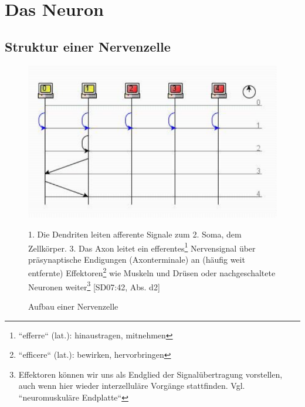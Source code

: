 \chapter{Das Neuron}

\section{Struktur einer Nervenzelle}

\begin{figure}[h]
	\centering
		\includegraphics{images/p1ReadSeq.pdf}
\caption{Aufbau einer Nervenzelle}
\small
 1. Die Dendriten leiten
 afferente Signale zum
 2. Soma, dem Zellkörper.
 3. Das Axon leitet ein
 efferentes\footnote{``efferre`` (lat.): hinaustragen, mitnehmen} Nervensignal über präsynaptische Endigungen (Axonterminale) an (häufig weit entfernte)
 Effektoren\footnote{``efficere`` (lat.): bewirken, hervorbringen}
    wie Muskeln und Drüsen oder nachgeschaltete Neuronen
 weiter\footnote{
     Effektoren können wir uns als Endglied der Signalübertragung vorstellen, auch wenn hier wieder interzelluläre Vorgänge stattfinden. Vgl. ``neuromuskuläre Endplatte``\cite[127, Abs. 3]{BCP18}
    } {[SD07:42, Abs. d2]}

\end{figure}



